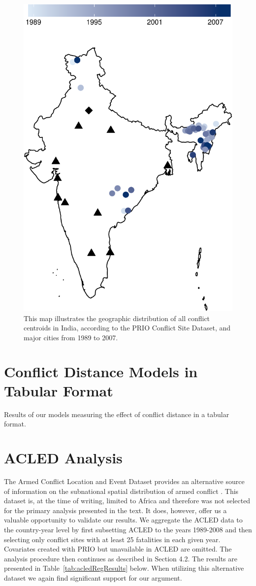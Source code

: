 \documentclass[12pt,onesided]{amsart}
\begin{document}
\begin{figure}[ht]
	\centering
	\includegraphics[width=.5\textwidth]{Graphics/indiaMap-crop}
	\caption{This map illustrates the geographic distribution of all conflict centroids in India, according to the PRIO Conflict Site Dataset, and major cities from 1989 to 2007. }
	\label{fig:indiaMap}
\end{figure}
\FloatBarrier

\clearpage
\section{Conflict Distance Models in Tabular Format}

Results of our models measuring the effect of conflict distance in a tabular format.  



\clearpage
\section{ACLED Analysis}
\label{acled}

The Armed Conflict Location and Event Dataset provides an alternative source of information on the subnational spatial distribution of armed conflict \citep{raleigh:linke:etal:2010}. This dataset is, at the time of writing, limited to Africa and therefore was not selected for the primary analysis presented in the text. It does, however, offer us a valuable opportunity to validate our results. We aggregate the ACLED data to the country-year level by first subsetting ACLED to the years 1989-2008 and then selecting only conflict sites with at least 25 fatalities in each given year. Covariates created with PRIO but unavailable in ACLED are omitted. The analysis procedure then continues as described in Section 4.2. The results are presented in Table~\ref{tab:acledRegResults} below. When utilizing this alternative dataset we again find significant support for our argument.
\end{document}
